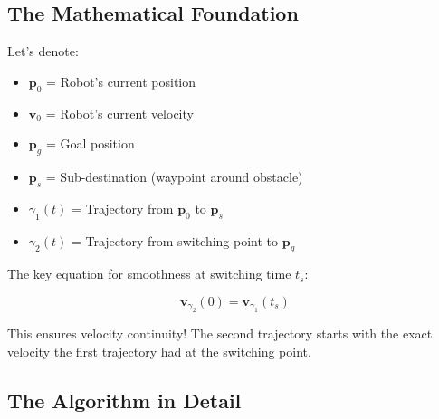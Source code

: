 \documentclass[12pt,a4paper]{article}
\begin{document}
\subsection{The Mathematical Foundation}

Let's denote:
\begin{itemize}
    \item $\mathbf{p}_0$ = Robot's current position
    \item $\mathbf{v}_0$ = Robot's current velocity  
    \item $\mathbf{p}_g$ = Goal position
    \item $\mathbf{p}_s$ = Sub-destination (waypoint around obstacle)
    \item $\gamma_1(t)$ = Trajectory from $\mathbf{p}_0$ to $\mathbf{p}_s$
    \item $\gamma_2(t)$ = Trajectory from switching point to $\mathbf{p}_g$
\end{itemize}

The key equation for smoothness at switching time $t_s$:

\begin{equation}
\boxed{\mathbf{v}_{\gamma_2}(0) = \mathbf{v}_{\gamma_1}(t_s)}
\end{equation}

This ensures velocity continuity! The second trajectory starts with the exact velocity the first trajectory had at the switching point.

\subsection{The Algorithm in Detail}
\end{document}
